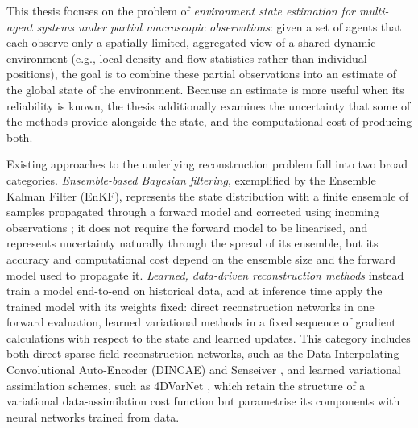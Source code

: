 \documentclass[english, 12pt, a4paper, elec, utf8, a-2b, online]{aaltothesis}
\begin{document}
This thesis focuses on the problem of \emph{environment state estimation for
multi-agent systems under partial macroscopic observations}: given a
set of agents that each observe only a spatially limited, aggregated
view of a shared dynamic environment (e.g., local density and flow
statistics rather than individual positions), the goal is to combine
these partial observations into an estimate of the global state of
the environment. Because an estimate is more useful when its reliability is
known, the thesis
additionally examines the uncertainty that some of the methods provide
alongside the state, and the computational cost of producing both.

Existing approaches to the underlying reconstruction problem fall
into two broad categories. \emph{Ensemble-based Bayesian filtering},
exemplified by the Ensemble Kalman Filter (EnKF), represents the
state distribution with a finite ensemble of samples propagated
through a forward model and corrected using incoming observations
\cite{roth2017enkf}; it does not require the forward model to
be linearised, and represents uncertainty naturally through the spread
of its ensemble, but its accuracy and computational cost depend on
the ensemble size and the forward model used to propagate it.
\emph{Learned, data-driven reconstruction methods} instead train a
model end-to-end on historical data, and at inference time apply the trained
model with its weights fixed: direct reconstruction networks in one forward
evaluation, learned variational methods in a fixed sequence of gradient
calculations with respect to the state and learned updates. This category includes both direct sparse field
reconstruction networks, such as the Data-Interpolating Convolutional
Auto-Encoder (DINCAE) \cite{barth2022dincae2} and
Senseiver \cite{santos2023senseiver}, and learned variational assimilation
schemes, such as 4DVarNet \cite{fablet2020fourdvarnet}, which retain the
structure of a variational data-assimilation cost function but
parametrise its components with neural networks trained from data.
\end{document}
